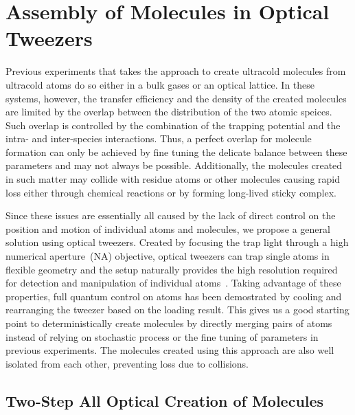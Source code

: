 \section{Assembly of Molecules in Optical Tweezers}
\label{ch:introduction:tweezers}

Previous experiments that takes the approach to create ultracold molecules
from ultracold atoms do so either in a bulk gases or an optical lattice.
In these systems, however, the transfer efficiency and
the density of the created molecules are limited
by the overlap between the distribution of the two atomic speices.
Such overlap is controlled by the combination of the trapping potential
and the intra- and inter-species interactions.
Thus, a perfect overlap for molecule formation can only be achieved by fine tuning
the delicate balance between these parameters and may not always be possible.
Additionally, the molecules created in such matter may collide
with residue atoms or other molecules causing rapid loss
either through chemical reactions or by forming long-lived sticky complex.

Since these issues are essentially all caused by the lack of direct control
on the position and motion of individual atoms and molecules,
we propose a general solution using optical tweezers.
Created by focusing the trap light through a high numerical aperture~(NA) objective,
optical tweezers can trap single atoms in flexible geometry
and the setup naturally provides the high resolution required
for detection and manipulation of individual atoms~\cite{schlosser_sub-poissonian_2001}.
Taking advantage of these properties, full quantum control on atoms has been demostrated
by cooling and rearranging the tweezer based on the loading result.
This gives us a good starting point to deterministically create molecules
by directly merging pairs of atoms instead of
relying on stochastic process or the fine tuning of parameters in previous experiments.
The molecules created using this approach are also well isolated from each other,
preventing loss due to collisions.

\subsection{Two-Step All Optical Creation of Molecules}
\label{ch:introduction:tweezers:two-step}

